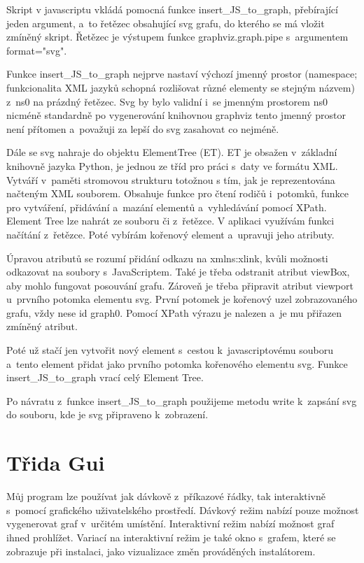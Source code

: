 \documentclass[color,table,oneside,nolot,nolof]{fithesis}
\begin{document}
	Skript v javascriptu vkládá pomocná funkce insert\_JS\_to\_graph, přebírající jeden argument, a~to řetězec obsahující svg grafu, do kterého se má vložit zmíněný skript. Řetězec je výstupem funkce
	graphviz.graph.pipe s~argumentem format="svg". 

	Funkce insert\_JS\_to\_graph nejprve nastaví výchozí jmenný prostor (namespace; funkcionalita XML jazyků schopná rozlišovat různé elementy se stejným názvem) z~ns0 na prázdný 
	řetězec. Svg by bylo validní i~se jmenným prostorem ns0 nicméně standardně po vygenerování knihovnou graphviz tento jmenný prostor není přítomen a~považuji za lepší do svg 
	zasahovat co nejméně. 

	Dále se svg nahraje do objektu ElementTree (ET). ET je obsažen v~základní knihovně jazyka Python, je jednou ze tříd pro práci s~daty ve formátu XML. Vytváří v~paměti stromovou
	strukturu totožnou s tím, jak je reprezentována načteným XML souborem. Obsahuje funkce pro čtení rodičů i~potomků, funkce pro vytváření, přidávání a~mazání elementů a~vyhledávání pomocí 
	XPath. Element Tree lze nahrát ze souboru či z~řetězce. V aplikaci využívám funkci načítání z~řetězce. Poté vybírám kořenový element a~upravuji jeho atributy.

	Úpravou atributů se rozumí přidání odkazu na xmlns:xlink, kvůli možnosti odkazovat na soubory s~JavaScriptem. Také je třeba odstranit atribut viewBox, aby mohlo fungovat posouvání
	grafu. Zároveň je třeba připravit atribut viewport u~prvního potomka elementu svg. První potomek je kořenový uzel zobrazovaného grafu, vždy nese id graph0. Pomocí XPath výrazu je
	nalezen a~je mu  přiřazen zmíněný atribut.

	Poté už stačí jen vytvořit nový element s~cestou k~javascriptovému souboru a~tento element přidat jako prvního potomka kořenového elementu svg. Funkce insert\_JS\_to\_graph vrací celý
	Element Tree.

	Po návratu z~funkce insert\_JS\_to\_graph použijeme metodu write k~zapsání svg do souboru, kde je svg připraveno k~zobrazení.

\section{Třida Gui}
	Můj program lze používat jak dávkově z~příkazové řádky, tak interaktivně s~pomocí grafického uživatelského prostředí. Dávkový režim nabízí pouze možnost vygenerovat graf v~určitém 
	umístění. Interaktivní režim nabízí možnost graf ihned prohlížet. Variací na interaktivní režim je také okno s~grafem, které se zobrazuje při instalaci, jako vizualizace změn prováděných
	instalátorem. 
\end{document}
